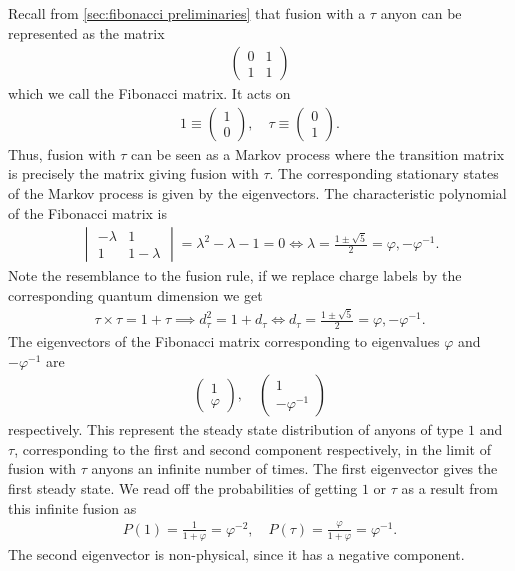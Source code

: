 Recall from \cref{sec:fibonacci preliminaries} that fusion with a $\tau$ anyon can be represented as the matrix
\begin{align}
  \begin{pmatrix}
    0 & 1 \\
    1 & 1
  \end{pmatrix}
\end{align}
which we call the Fibonacci matrix. It acts on
\begin{align}
  1 \equiv \begin{pmatrix} 1 \\ 0 \end{pmatrix}, \quad \tau \equiv \begin{pmatrix} 0 \\ 1 \end{pmatrix}.
\end{align}
Thus, fusion with $τ$ can be seen as a Markov process where the transition matrix is precisely the matrix giving fusion with $τ$. The corresponding stationary states of the Markov process is given by the eigenvectors. The characteristic polynomial of the Fibonacci matrix is
\begin{align}
  \begin{vmatrix}
    -λ & 1 \\
    1 & 1-λ
  \end{vmatrix} =
  λ^2-λ-1 = 0 \iff \lambda = \frac{1±\sqrt{5}}{2} = φ, -φ^{-1}.
\end{align}
Note the resemblance to the fusion rule, if we replace charge labels by the corresponding quantum dimension we get
\begin{align}
  τ × τ = 1 + τ \implies d_τ^2 = 1 + d_τ \iff d_τ = \frac{1±\sqrt{5}}{2} = φ, -φ^{-1}.
\end{align}
The eigenvectors of the Fibonacci matrix corresponding to eigenvalues $φ$ and $-φ^{-1}$ are
\begin{align}
  \begin{pmatrix}
    1 \\ φ
  \end{pmatrix}, \quad
  \begin{pmatrix}
    1 \\ -φ^{-1}
  \end{pmatrix}
\end{align}
respectively. This represent the steady state distribution of anyons of type $1$ and $τ$, corresponding to the first and second component respectively, in the limit of fusion with $\tau$ anyons an infinite number of times. The first eigenvector gives the first steady state. We read off the probabilities of getting $1$ or $\tau$ as a result from this infinite fusion as
\begin{align}
  P(1) = \frac{1}{1+φ} = φ^{-2}, \quad
  P(τ) = \frac{φ}{1+φ} = φ^{-1}.
\end{align}
The second eigenvector is non-physical, since it has a negative component.

